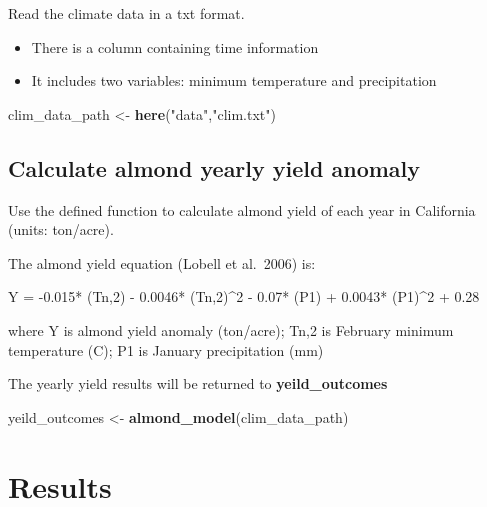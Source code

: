 \documentclass[
]{article}
\newenvironment{Shaded}{\begin{snugshade}}{\end{snugshade}}
\newcommand{\KeywordTok}[1]{\textcolor[rgb]{0.13,0.29,0.53}{\textbf{#1}}}
\newcommand{\NormalTok}[1]{#1}
\newcommand{\StringTok}[1]{\textcolor[rgb]{0.31,0.60,0.02}{#1}}
\providecommand{\tightlist}{%
  \setlength{\itemsep}{0pt}\setlength{\parskip}{0pt}}
\begin{document}
Read the climate data in a txt format.

\begin{itemize}
\tightlist
\item
  There is a column containing time information
\item
  It includes two variables: minimum temperature and precipitation
\end{itemize}

\begin{Shaded}
\begin{Highlighting}[]
\NormalTok{clim_data_path <-}\StringTok{ }\KeywordTok{here}\NormalTok{(}\StringTok{"data"}\NormalTok{,}\StringTok{"clim.txt"}\NormalTok{)}
\end{Highlighting}
\end{Shaded}

\hypertarget{calculate-almond-yearly-yield-anomaly}{%
\subsection{Calculate almond yearly yield
anomaly}\label{calculate-almond-yearly-yield-anomaly}}

Use the defined function to calculate almond yield of each year in
California (units: ton/acre).

The almond yield equation (Lobell et al.~2006) is:

Y = -0.015* (Tn,2) - 0.0046* (Tn,2)\^{}2 - 0.07* (P1) + 0.0043*
(P1)\^{}2 + 0.28

where Y is almond yield anomaly (ton/acre); Tn,2 is February minimum
temperature (C); P1 is January precipitation (mm)

The yearly yield results will be returned to \textbf{yeild\_outcomes}

\begin{Shaded}
\begin{Highlighting}[]
\NormalTok{yeild_outcomes <-}\StringTok{ }\KeywordTok{almond_model}\NormalTok{(clim_data_path)}
\end{Highlighting}
\end{Shaded}

\hypertarget{results}{%
\section{Results}\label{results}}
\end{document}

